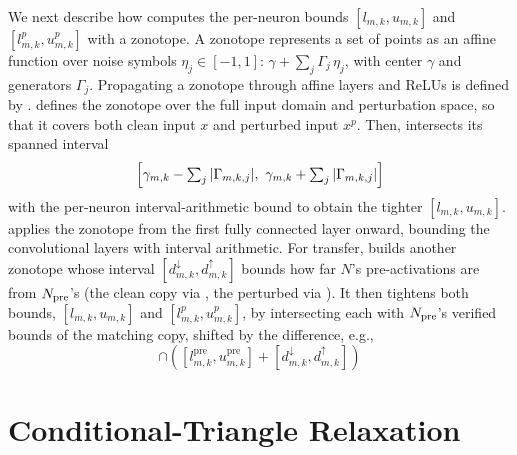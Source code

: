 {\sloppy
We next describe how \tool computes the per-neuron bounds
$[l_{m,k},u_{m,k}]$ and $[l^{p}_{m,k},u^{p}_{m,k}]$ with a zonotope. A zonotope represents a set of
points as an affine function over noise symbols $\eta_j\in[-1,1]$:
$\gamma+\textstyle\sum_j \Gamma_j\,\eta_j$, with center $\gamma$ and generators $\Gamma_j$. Propagating a zonotope through
affine layers and ReLUs is defined by \citet{singh2018fast}. \tool defines the zonotope over the full input domain and perturbation space,
so that it covers both clean input $x$ and perturbed input $x^p$. Then, \tool intersects its spanned interval
\begin{equation}
 \Bigl[\gamma_{m,k}-\textstyle\sum_j|\Gamma_{m,k,j}|,\ \gamma_{m,k}+\textstyle\sum_j|\Gamma_{m,k,j}|\Bigr]
 \label{eq:zonotope-interval}
\end{equation}
with the
per-neuron interval-arithmetic bound to obtain the tighter $[l_{m,k},u_{m,k}]$. \tool applies the
zonotope from the first fully connected layer onward, bounding the convolutional layers with interval
arithmetic. For transfer, \tool builds
another zonotope whose interval $[d^{\downarrow}_{m,k},d^{\uparrow}_{m,k}]$ bounds how far $N$'s
pre-activations are from $N_{\mathrm{pre}}$'s (the clean copy via , the perturbed
via ).%
 It then tightens both bounds, $[l_{m,k},u_{m,k}]$ and $[l^{p}_{m,k},u^{p}_{m,k}]$, by intersecting each
with $N_{\mathrm{pre}}$'s verified bounds of the matching copy, shifted by the difference, e.g., 
\begin{equation}
 [l_{m,k},u_{m,k}]\cap([l^{\mathrm{pre}}_{m,k},u^{\mathrm{pre}}_{m,k}]+[d^{\downarrow}_{m,k},d^{\uparrow}_{m,k}])
 \label{eq:transfer-intersection}
\end{equation}


\section{Conditional-Triangle Relaxation}
\label{sec:blend-condtri}

}
